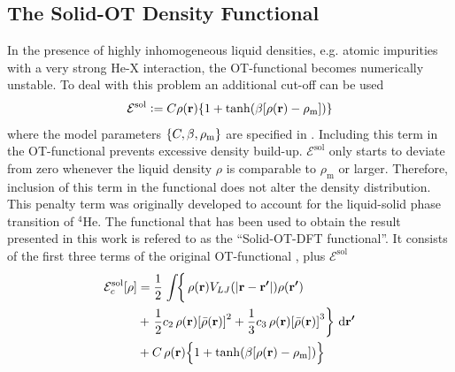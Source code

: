 		\subsection{The Solid-OT Density Functional}
			In the presence of highly inhomogeneous liquid densities, e.g. atomic impurities with a very strong He-X interaction, the OT-functional  becomes numerically unstable. To deal with this problem an additional cut-off can be used
			\begin{align}
				\mathcal{E}^\mathrm{sol} \vcentcolon= C\rho(\bm{\mathrm{r}})\qty{1+\tanh(\beta\qty[\rho(\bm{\mathrm{r}})-\rho_\mathrm{m}])}
			\end{align}
			where the model parameters $\qty{C,\beta,\rho_\mathrm{m}}$ are specified in . Including this term in the OT-functional prevents excessive density build-up. $\mathcal{E}^\mathrm{sol}$ only starts to deviate from zero whenever the liquid density $\rho$ is comparable to $\rho_\mathrm{m}$ or larger. Therefore, inclusion of this term in the functional does not alter the density distribution. This penalty term was originally developed to account for the liquid-solid phase transition of $^4$He\citep{Anc05a,Cau07}. The functional that has been used to obtain the result presented in this work is refered to as the ``Solid-OT-DFT functional''. It consists of the first three terms of the original OT-functional , plus $\mathcal{E}^\mathrm{sol}$
			\begin{align}
				\mathcal{E}_c^\mathrm{sol}[\rho] &=  
				\frac{1}{2} \left.\int \! \right\{\rho(\bm{\mathrm{r}}) V_{LJ}(\abs{\bm{\mathrm{r}}-\bm{\mathrm{r'}}}) \rho(\bm{\mathrm{r'}}) \nonumber \\
				&+ \left.\frac{1}{2} c_2\, \rho(\bm{\mathrm{r}}) \qty[\bar\rho(\bm{\mathrm{r}})]^2 
				+ \frac{1}{3} c_3 \, \rho(\bm{\mathrm{r}}) \qty[\bar\rho(\bm{\mathrm{r}})]^3\right\}\,\mathrm{d}{\bm{\mathrm{r'}}} \nonumber \\
				&+ C\,\rho(\bm{\mathrm{r}})\qty\Big{1+\tanh(\beta\qty[\rho(\bm{\mathrm{r}})-\rho_\mathrm{m}])} \label{eq:solid-otf}
			\end{align}

